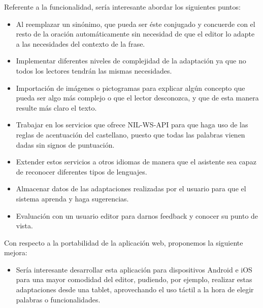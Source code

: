 Referente a la funcionalidad, sería interesante abordar los siguientes puntos:

\begin{itemize}
	\item	Al reemplazar un sinónimo, que pueda ser éste conjugado y concuerde con el resto de la oración automáticamente sin necesidad de que el editor lo adapte a las necesidades del contexto de la frase.
		\item	Implementar diferentes niveles de complejidad de la adaptación ya que no todos los lectores tendrán las mismas necesidades.
	\item Importación de imágenes o pictogramas para explicar algún concepto que pueda ser algo más complejo o que el lector desconozca, y que de esta manera resulte más claro el texto.
	\item	Trabajar en los servicios que ofrece NIL-WS-API para que haga uso de las reglas de acentuación del castellano, puesto que todas las palabras vienen dadas sin signos de puntuación.
	\item	Extender estos servicios a otros idiomas de manera que el asistente sea capaz de reconocer diferentes tipos de lenguajes.
	
	\item  Almacenar datos de las adaptaciones realizadas por el usuario para que el sistema aprenda y haga sugerencias.
	\item Evaluación con un usuario editor para darnos feedback y conocer su punto de vista.
\end{itemize}	
Con respecto a la portabilidad de la aplicación web, proponemos la siguiente mejora:
\begin{itemize}
	\item	Sería interesante desarrollar esta aplicación para dispositivos Android e iOS para una mayor comodidad del editor, pudiendo, por ejemplo, realizar estas adaptaciones desde una tablet, aprovechando el uso táctil a la hora de elegir palabras o funcionalidades.

\end{itemize}

